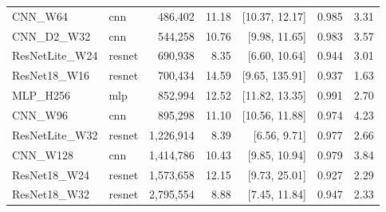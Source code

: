 \begin{table}[h]
\begin{tabular}{llrrrrr}
CNN\_W64 & cnn & 486,402 & 11.18 & [10.37, 12.17] & 0.985 & 3.31 \\
CNN\_D2\_W32 & cnn & 544,258 & 10.76 & [9.98, 11.65] & 0.983 & 3.57 \\
ResNetLite\_W24 & resnet & 690,938 & 8.35 & [6.60, 10.64] & 0.944 & 3.01 \\
ResNet18\_W16 & resnet & 700,434 & 14.59 & [9.65, 135.91] & 0.937 & 1.63 \\
MLP\_H256 & mlp & 852,994 & 12.52 & [11.82, 13.35] & 0.991 & 2.70 \\
CNN\_W96 & cnn & 895,298 & 11.10 & [10.56, 11.88] & 0.974 & 4.23 \\
ResNetLite\_W32 & resnet & 1,226,914 & 8.39 & [6.56, 9.71] & 0.977 & 2.66 \\
CNN\_W128 & cnn & 1,414,786 & 10.43 & [9.85, 10.94] & 0.979 & 3.84 \\
ResNet18\_W24 & resnet & 1,573,658 & 12.15 & [9.73, 25.01] & 0.927 & 2.29 \\
ResNet18\_W32 & resnet & 2,795,554 & 8.88 & [7.45, 11.84] & 0.947 & 2.33 \\
\bottomrule
\end{tabular}
\end{table}
